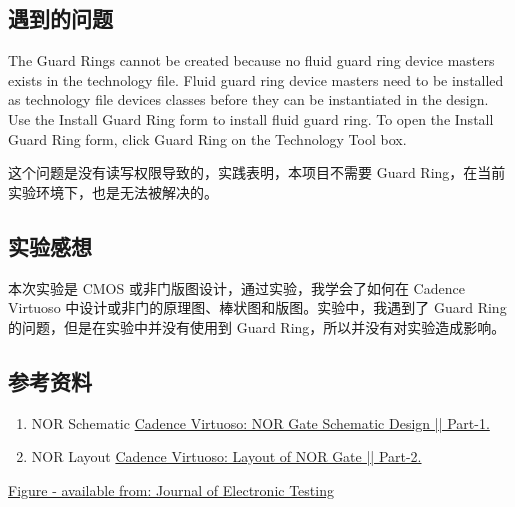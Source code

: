 \documentclass{theme-2614084}
\begin{document}
\subsection{遇到的问题}

The Guard Rings cannot be created because no fluid guard ring device masters exists in the technology file. Fluid guard ring device masters need to be installed as technology file devices classes before they can be instantiated in the design. Use the Install Guard Ring form to install fluid guard ring. To open the Install Guard Ring form, click Guard Ring on the Technology Tool box.

这个问题是没有读写权限导致的，实践表明，本项目不需要 Guard Ring，在当前实验环境下，也是无法被解决的。

\subsection{实验感想}

本次实验是 CMOS 或非门版图设计，通过实验，我学会了如何在 Cadence Virtuoso 中设计或非门的原理图、棒状图和版图。实验中，我遇到了 Guard Ring 的问题，但是在实验中并没有使用到 Guard Ring，所以并没有对实验造成影响。

\subsection{参考资料}

\begin{enumerate}
  \item NOR Schematic \href{https://youtu.be/px6oiPdUbMc?si=_LwnCewLOgvMCMDY}{Cadence Virtuoso: NOR Gate Schematic Design || Part-1.}
  \item NOR Layout \href{https://youtu.be/X-ke0KeekQE?si=powLM9bueuKSMTmW}{Cadence Virtuoso: Layout of NOR Gate || Part-2.}
\end{enumerate}

\href{https://www.researchgate.net/figure/The-layouts-of-2-input-standard-a-NAND-and-b-NOR-gates-where-metal-layers-are_fig1_319635790}{Figure - available from: Journal of Electronic Testing}
\end{document}
